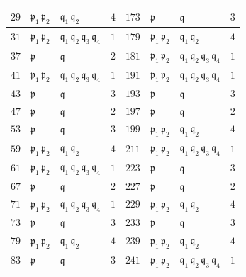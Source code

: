 \begin{figure}
\begin{center}
\begin{tabular}{x{1cm}x{1.25cm}x{1.5cm}x{1cm}x{1cm}x{1.25cm}x{1.5cm}x{1cm}}
      \hline
      $29$ & $\mathfrak{p}_1\,\mathfrak{p}_2$ & $\mathfrak{q}_1\,\mathfrak{q}_2$ & $4$ & $173$ & $\mathfrak{p}$ & $\mathfrak{q}$ & $3$ \tabularnewline
      \hline
      $31$ & $\mathfrak{p}_1\,\mathfrak{p}_2$ & $\mathfrak{q}_1\,\mathfrak{q}_2\,\mathfrak{q}_3\,\mathfrak{q}_4$ & $1$ & $179$ & $\mathfrak{p}_1\,\mathfrak{p}_2$ & $\mathfrak{q}_1\,\mathfrak{q}_2$ & $4$ \tabularnewline
      \hline
      $37$ & $\mathfrak{p}$ & $\mathfrak{q}$ & $2$ & $181$ & $\mathfrak{p}_1\,\mathfrak{p}_2$ & $\mathfrak{q}_1\,\mathfrak{q}_2\,\mathfrak{q}_3\,\mathfrak{q}_4$ & $1$ \tabularnewline
      \hline
      $41$ & $\mathfrak{p}_1\,\mathfrak{p}_2$ & $\mathfrak{q}_1\,\mathfrak{q}_2\,\mathfrak{q}_3\,\mathfrak{q}_4$ & $1$ & $191$ & $\mathfrak{p}_1\,\mathfrak{p}_2$ & $\mathfrak{q}_1\,\mathfrak{q}_2\,\mathfrak{q}_3\,\mathfrak{q}_4$ & $1$ \tabularnewline
      \hline
      $43$ & $\mathfrak{p}$ & $\mathfrak{q}$ & $3$ & $193$ & $\mathfrak{p}$ & $\mathfrak{q}$ & $3$ \tabularnewline
      \hline
      $47$ & $\mathfrak{p}$ & $\mathfrak{q}$ & $2$ & $197$ & $\mathfrak{p}$ & $\mathfrak{q}$ & $2$ \tabularnewline
      \hline
      $53$ & $\mathfrak{p}$ & $\mathfrak{q}$ & $3$ & $199$ & $\mathfrak{p}_1\,\mathfrak{p}_2$ & $\mathfrak{q}_1\,\mathfrak{q}_2$ & $4$ \tabularnewline
      \hline
      $59$ & $\mathfrak{p}_1\,\mathfrak{p}_2$ & $\mathfrak{q}_1\,\mathfrak{q}_2$ & $4$ & $211$ & $\mathfrak{p}_1\,\mathfrak{p}_2$ & $\mathfrak{q}_1\,\mathfrak{q}_2\,\mathfrak{q}_3\,\mathfrak{q}_4$ & $1$ \tabularnewline
      \hline
      $61$ & $\mathfrak{p}_1\,\mathfrak{p}_2$ & $\mathfrak{q}_1\,\mathfrak{q}_2\,\mathfrak{q}_3\,\mathfrak{q}_4$ & $1$ & $223$ & $\mathfrak{p}$ & $\mathfrak{q}$ & $3$ \tabularnewline
      \hline
      $67$ & $\mathfrak{p}$ & $\mathfrak{q}$ & $2$ & $227$ & $\mathfrak{p}$ & $\mathfrak{q}$ & $2$ \tabularnewline
      \hline
      $71$ & $\mathfrak{p}_1\,\mathfrak{p}_2$ & $\mathfrak{q}_1\,\mathfrak{q}_2\,\mathfrak{q}_3\,\mathfrak{q}_4$ & $1$ & $229$ & $\mathfrak{p}_1\,\mathfrak{p}_2$ & $\mathfrak{q}_1\,\mathfrak{q}_2$ & $4$ \tabularnewline
      \hline
      $73$ & $\mathfrak{p}$ & $\mathfrak{q}$ & $3$ & $233$ & $\mathfrak{p}$ & $\mathfrak{q}$ & $3$ \tabularnewline
      \hline
      $79$ & $\mathfrak{p}_1\,\mathfrak{p}_2$ & $\mathfrak{q}_1\,\mathfrak{q}_2$ & $4$ & $239$ & $\mathfrak{p}_1\,\mathfrak{p}_2$ & $\mathfrak{q}_1\,\mathfrak{q}_2$ & $4$ \tabularnewline
      \hline
      $83$ & $\mathfrak{p}$ & $\mathfrak{q}$ & $3$ & $241$ & $\mathfrak{p}_1\,\mathfrak{p}_2$ & $\mathfrak{q}_1\,\mathfrak{q}_2\,\mathfrak{q}_3\,\mathfrak{q}_4$ & $1$ \tabularnewline
      \hline

\end{tabular}
\end{center}
\end{figure}
